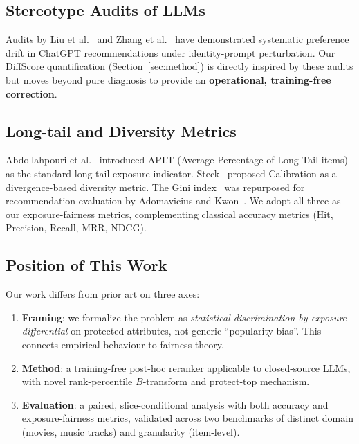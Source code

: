 \subsection{Stereotype Audits of LLMs}

Audits by Liu et al.~\cite{liu2023chatgpt} and Zhang et al.~\cite{zhang2024counterfactual} have demonstrated systematic preference drift in ChatGPT recommendations under identity-prompt perturbation. Our DiffScore quantification (Section~\ref{sec:method}) is directly inspired by these audits but moves beyond pure diagnosis to provide an \textbf{operational, training-free correction}.

\subsection{Long-tail and Diversity Metrics}

Abdollahpouri et al.~\cite{abdollahpouri2017aplt} introduced APLT (Average Percentage of Long-Tail items) as the standard long-tail exposure indicator. Steck~\cite{steck2018calibrated} proposed Calibration as a divergence-based diversity metric. The Gini index~\cite{atkinson1970gini} was repurposed for recommendation evaluation by Adomavicius and Kwon~\cite{adomavicius2012diversity}. We adopt all three as our exposure-fairness metrics, complementing classical accuracy metrics (Hit, Precision, Recall, MRR, NDCG).

\subsection{Position of This Work}

Our work differs from prior art on three axes:
\begin{enumerate}
\item \textbf{Framing}: we formalize the problem as \emph{statistical discrimination by exposure differential} on protected attributes, not generic ``popularity bias''. This connects empirical behaviour to fairness theory.
\item \textbf{Method}: a training-free post-hoc reranker applicable to closed-source LLMs, with novel rank-percentile $B$-transform and protect-top mechanism.
\item \textbf{Evaluation}: a paired, slice-conditional analysis with both accuracy and exposure-fairness metrics, validated across two benchmarks of distinct domain (movies, music tracks) and granularity (item-level).
\end{enumerate}
